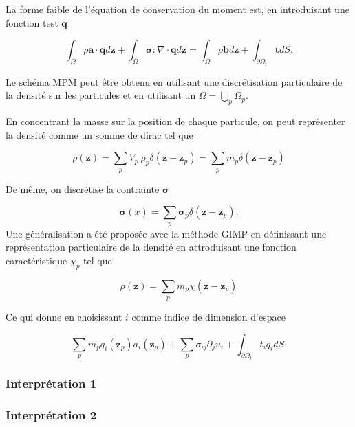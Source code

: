 La forme faible de l'équation de conservation du moment est, en introduisant une fonction test $\bm q$

\begin{equation*}
    \int_\Omega \rho \bm a \cdot \bm q d\bm z + \int_\Omega \bm \sigma : \nabla \cdot \bm q d\bm z = \int_\Omega \rho \bm b d\bm z + \int_{\partial \Omega_t} \bm t dS.
\end{equation*}

Le schéma MPM peut être obtenu en utilisant une discrétisation particulaire de la densité sur les particules et en utilisant un  $\Omega = \bigcup_p \Omega_p$.

En concentrant la masse sur la position de chaque particule, on peut représenter la densité comme un somme de dirac tel que

\begin{equation*}
    \rho(\bm z) = \sum_p V_p~\rho_p \delta(\bm z - \bm z_p) = \sum_p m_p \delta(\bm z - \bm z_p)
\end{equation*}

De même, on discrétise la contrainte $\bm \sigma$

\begin{equation*}
    \bm \sigma(x) = \sum_p \bm \sigma_p \delta(\bm z - \bm z_p).
\end{equation*}
Une généralisation a été proposée avec la méthode GIMP \cite{bardenhagen_generalized_2004} en définissant une représentation particulaire de la densité en attroduisant une fonction caractéristique $\chi_p$ tel que

\begin{equation*}
    \rho(\bm z) = \sum_p m_p \chi(\bm z - \bm z_p)
\end{equation*}

Ce qui donne en choisissant $i$ comme indice de dimension d'espace

\begin{equation*}
    \sum_p m_p q_i(\bm z_p) a_i(\bm z_p) + \sum_p \sigma_{ij} \partial_j u_i + \int_{\partial \Omega_t} t_i q_i dS.
\end{equation*}


\subsubsection{Interprétation 1}

\subsubsection{Interprétation 2}

